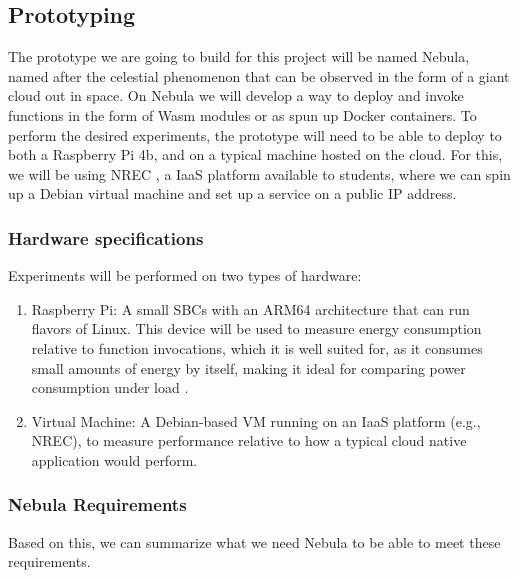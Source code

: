 \documentclass[
  table]{report}
\begin{document}
\subsection{Prototyping}
\label{sect:prototyping}

The prototype we are going to build for this project will be named
Nebula, named after the celestial phenomenon that can be observed in the
form of a giant cloud out in space. On Nebula we will develop a way to
deploy and invoke functions in the form of \ac{Wasm} modules or as spun
up Docker containers. To perform the desired experiments, the prototype
will need to be able to deploy to both a Raspberry Pi 4b, and on a
typical machine hosted on the cloud. For this, we will be using
\ac{NREC} , a IaaS platform available to
students, where we can spin up a Debian virtual machine and set up a
service on a public IP address.

\subsubsection{Hardware specifications}
\label{sect:hardware_spec}

Experiments will be performed on two types of hardware:

\begin{enumerate}
\def\labelenumi{\arabic{enumi}.}
\item
  Raspberry Pi: A small \ac{SBC}s with an ARM64 architecture that can
  run flavors of Linux. This device will be used to measure energy
  consumption relative to function invocations, which it is well suited
  for, as it consumes small amounts of energy by itself, making it ideal
  for comparing power consumption under load
  \citep{bekarooPowerConsumptionRaspberry2016}.
\item
  Virtual Machine: A Debian-based VM running on an \ac{IaaS} platform
  (e.g., \ac{NREC}), to measure performance relative to how a typical
  cloud native application would perform.
\end{enumerate}

\newpage
\subsubsection{Nebula Requirements}
\label{sect:nebula_req}

Based on this, we can summarize what we need Nebula to be able to meet
these requirements.
\end{document}
